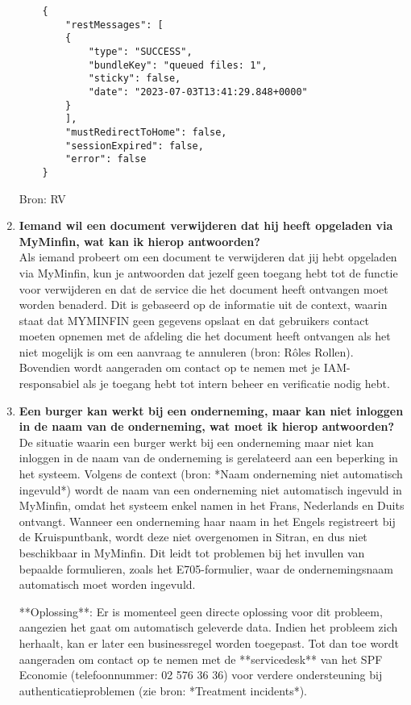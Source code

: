 \begin{enumerate}
\begin{verbatim}
    {
        "restMessages": [
        {
            "type": "SUCCESS",
            "bundleKey": "queued files: 1",
            "sticky": false,
            "date": "2023-07-03T13:41:29.848+0000"
        }
        ],
        "mustRedirectToHome": false,
        "sessionExpired": false,
        "error": false
    }
\end{verbatim}

        
    Bron: RV
    \item \textbf{Iemand wil een document verwijderen dat hij heeft opgeladen via MyMinfin, wat kan ik hierop antwoorden?} \\
    Als iemand probeert om een document te verwijderen dat jij hebt opgeladen via MyMinfin, kun je antwoorden dat jezelf geen toegang hebt tot de functie voor verwijderen en dat de service die het document heeft ontvangen moet worden benaderd. Dit is gebaseerd op de informatie uit de context, waarin staat dat MYMINFIN geen gegevens opslaat en dat gebruikers contact moeten opnemen met de afdeling die het document heeft ontvangen als het niet mogelijk is om een aanvraag te annuleren (bron: Rôles Rollen). Bovendien wordt aangeraden om contact op te nemen met je IAM-responsabiel als je toegang hebt tot intern beheer en verificatie nodig hebt.
    
    \item \textbf{Een burger kan werkt bij een onderneming, maar kan niet inloggen in de naam van de onderneming, wat moet ik hierop antwoorden?} \\
    De situatie waarin een burger werkt bij een onderneming maar niet kan inloggen in de naam van de onderneming is gerelateerd aan een beperking in het systeem. Volgens de context (bron: *Naam onderneming niet automatisch ingevuld*) wordt de naam van een onderneming niet automatisch ingevuld in MyMinfin, omdat het systeem enkel namen in het Frans, Nederlands en Duits ontvangt. Wanneer een onderneming haar naam in het Engels registreert bij de Kruispuntbank, wordt deze niet overgenomen in Sitran, en dus niet beschikbaar in MyMinfin. Dit leidt tot problemen bij het invullen van bepaalde formulieren, zoals het E705-formulier, waar de ondernemingsnaam automatisch moet worden ingevuld.
    
    **Oplossing**: Er is momenteel geen directe oplossing voor dit probleem, aangezien het gaat om automatisch geleverde data. Indien het probleem zich herhaalt, kan er later een businessregel worden toegepast. Tot dan toe wordt aangeraden om contact op te nemen met de **servicedesk** van het SPF Economie (telefoonnummer: 02 576 36 36) voor verdere ondersteuning bij authenticatieproblemen (zie bron: *Treatment incidents*). 
    

\end{enumerate}

